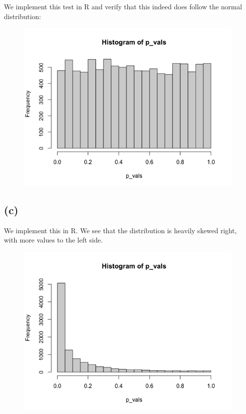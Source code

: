 \documentclass{article}
\begin{document}
{We implement this test in R and verify that this indeed does follow the normal distribution: 
\begin{figure}[h!]
  \centering
  \includegraphics[width=375pt]{hw7_2b.png}
\end{figure}

\subsection*{(c)}

We implement this in R. We see that the distribution is heavily skewed right, with more values to the left side.
\begin{figure}[h!]
  \centering
  \includegraphics[width=375pt]{hw7_2c.png}
\end{figure}

}
\end{document}
